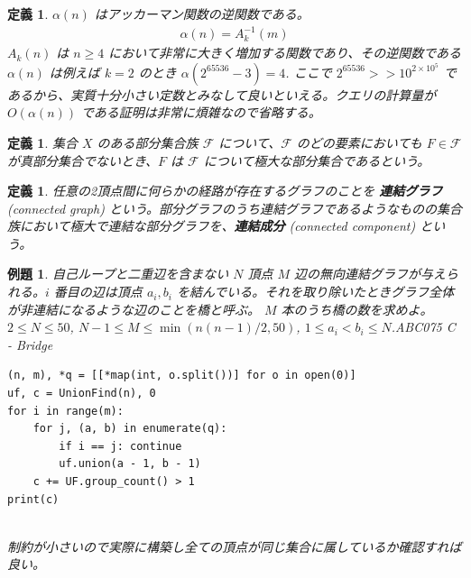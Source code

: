 \documentclass[12pt, a4j]{ltjsarticle}
\newtheorem{defi}[thm]{定義}
\newtheorem{exm}[thm]{例題}
\begin{document}
\vspace{1cm}

\begin{defi} $\alpha(n)$ はアッカーマン関数の逆関数である。
\begin{align}
\alpha(n) = A_k^{-1}(m)
\end{align}
$A_k(n)$ は $n\ge 4$ において非常に大きく増加する関数であり、その逆関数である $\alpha(n)$ は例えば $k=2$ のとき $\alpha(2^{65536}-3)=4$. ここで $2^{65536}>> 10^{2\times 10^5}$ であるから、実質十分小さい定数とみなして良いといえる。クエリの計算量が $O(\alpha(n))$ である証明は非常に煩雑なので省略する。
\end{defi}
\newpage

\begin{defi}
集合 $X$ のある部分集合族 $\mathscr{F}$ について、$\mathscr{F}$ のどの要素においても $F\in\mathscr{F}$ が真部分集合でないとき、$F$ は $\mathscr{F}$ について極大な部分集合であるという。
\end{defi}

\vspace{1cm}

\begin{defi}
任意の2頂点間に何らかの経路が存在するグラフのことを {\bf 連結グラフ} (connected graph) という。部分グラフのうち連結グラフであるようなものの集合族において極大で連結な部分グラフを、{\bf 連結成分} (connected component) という。
\end{defi}

\vspace{1cm}

\begin{exm}自己ループと二重辺を含まない $N$ 頂点 $M$ 辺の無向連結グラフが与えられる。$i$ 番目の辺は頂点 $a_i,b_i$ を結んでいる。それを取り除いたときグラフ全体が非連結になるような辺のことを橋と呼ぶ。 $M$ 本のうち橋の数を求めよ。$2\le N \le 50$, $N-1\le M \le \min(n(n-1)/2, 50)$, $1\le a_i < b_i \le N$.\quad\upshape ABC075 C - Bridge\\
\begin{lstlisting}
(n, m), *q = [[*map(int, o.split())] for o in open(0)]
uf, c = UnionFind(n), 0
for i in range(m):
    for j, (a, b) in enumerate(q):
        if i == j: continue
        uf.union(a - 1, b - 1)
    c += UF.group_count() > 1
print(c)
\end{lstlisting}\quad\\
制約が小さいので実際に構築し全ての頂点が同じ集合に属しているか確認すれば良い。
\end{exm}

\newpage
\end{document}
